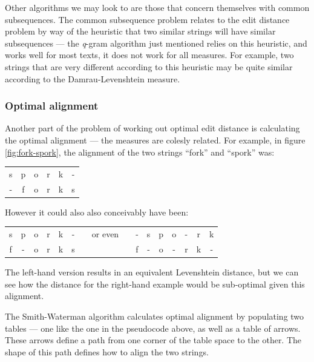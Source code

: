 \documentclass[a4paper,11pt,twoside,notitlepage]{article}
\begin{document}
        Other algorithms we may look to are those that concern
        themselves with common subsequences. The common subsequence
        problem relates to the edit distance problem by way of the
        heuristic that two similar strings will have similar
        subsequences --- the \textit{q}-gram algorithm just mentioned
        relies on this heuristic, and works well for most texts,
        it does not work for all measures. For example, two strings
        that are very different according to this heuristic may be
        quite similar according to the Damrau-Levenshtein measure.
        
        \subsubsection*{Optimal alignment}
        Another part of the problem of working out optimal edit
        distance is calculating the optimal alignment --- the measures
        are colesly related. For example, in
        figure \ref{fig:fork-spork}, the alignment of the two strings
        ``fork'' and ``spork'' was:

        \begin{center}
          \begin{tabular}{cccccc}
            s & p & o & r & k & -\\
            - & f & o & r & k & s 
          \end{tabular}
        \end{center}

        However it could also also conceivably have been:

        \begin{center}
          \begin{tabular}{cccccccccccccccc}
            s & p & o & r & k & - & & or even & & - & s & p & o & - & r & k \\
            f & - & o & r & k & s & &         & & f & - & o & - & r & k & -    
          \end{tabular}
        \end{center}

        The left-hand version results in an equivalent Levenshtein
        distance, but we can see how the distance for the right-hand
        example would be sub-optimal given this alignment.

        The Smith-Waterman algorithm\cite{Smith1981} calculates
        optimal alignment by populating two tables --- one like the
        one in the pseudocode above, as well as a table of
        arrows. These arrows define a path from one corner of the
        table space to the other. The shape of this path defines how
        to align the two strings.
\end{document}
